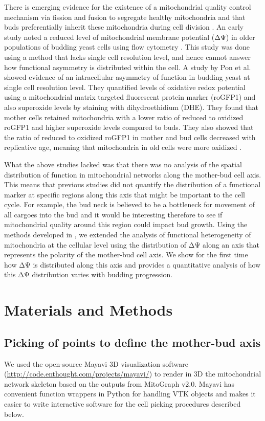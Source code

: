 There is emerging evidence for the existence of a mitochondrial quality control mechanism via fission and fusion to segregate healthy mitochondria and that buds preferentially inherit these mitochondria during cell division \cite{klinger_quantitation_2010,mcfaline-figueroa_mitochondrial_2011}. An early study noted a reduced level of mitochondrial membrane potential (ΔΨ) in older populations of budding yeast cells using flow cytometry \cite{lai_mutation_2002}. This study was done using a method that lacks single cell resolution level, and hence cannot answer how functional asymmetry is distributed within the cell. A study by Pon et al. \cite{mcfaline-figueroa_mitochondrial_2011} showed evidence of an intracellular asymmetry of function in budding yeast at single cell resolution level. They quantified levels of oxidative redox potential using a mitochondrial matrix targeted fluorescent protein marker (roGFP1) and also superoxide levels by staining with dihydroethidium (DHE). They found that mother cells retained mitochondria with a lower ratio of reduced to oxidized roGFP1 and higher superoxide levels compared to buds. They also showed that the ratio of reduced to oxidized roGFP1 in mother and bud cells decreased with replicative age, meaning that mitochondria in old cells were more oxidized .

What the above studies lacked was that there was no analysis of the spatial distribution of function in mitochondrial networks along the mother-bud cell axis. This means that previous studies did not quantify the distribution of a functional marker at specific regions along this axis that might be important to the cell cycle. For example, the bud neck is believed to be a bottleneck for movement of all cargoes into the bud \cite{vevea_inheritance_2014} and it would be interesting therefore to see if mitochondrial quality around this region could impact bud growth. Using the methods developed in , we extended the analysis of functional heterogeneity of mitochondria at the cellular level using the distribution of ΔΨ along an axis that represents the polarity of the mother-bud cell axis. We show for the first time how ΔΨ is distributed along this axis and provides a quantitative analysis of how this ΔΨ distribution varies with budding progression.
\section{Materials and Methods}
\subsection{Picking of points to define the mother-bud axis}
We used the open-source Mayavi 3D visualization software (\url{http://code.enthought.com/projects/mayavi/}) to render in 3D the mitochondrial network skeleton based on the outputs from MitoGraph v2.0. Mayavi has convenient function wrappers in Python for handling VTK objects and makes it easier to write interactive software for the cell picking procedures described below.

